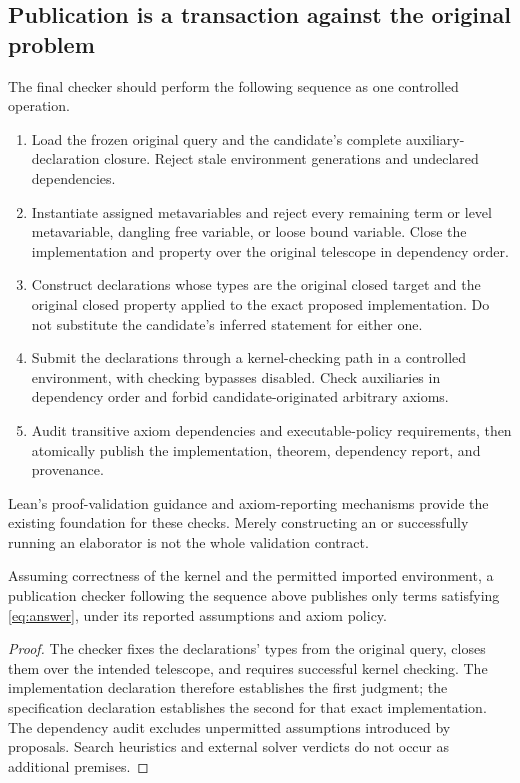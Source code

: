 \subsection{Publication is a transaction against the original problem}
The final checker should perform the following sequence as one controlled operation.
\begin{enumerate}
\item Load the frozen original query and the candidate's complete auxiliary-declaration closure. Reject stale environment generations and undeclared dependencies.
\item Instantiate assigned metavariables and reject every remaining term or level metavariable, dangling free variable, or loose bound variable. Close the implementation and property over the original telescope in dependency order.
\item Construct declarations whose types are the original closed target and the original closed property applied to the exact proposed implementation. Do not substitute the candidate's inferred statement for either one.
\item Submit the declarations through a kernel-checking path in a controlled environment, with checking bypasses disabled. Check auxiliaries in dependency order and forbid candidate-originated arbitrary axioms.
\item Audit transitive axiom dependencies and executable-policy requirements, then atomically publish the implementation, theorem, dependency report, and provenance.
\end{enumerate}
Lean's proof-validation guidance and axiom-reporting mechanisms provide the existing foundation for these checks. Merely constructing an \Expr{} or successfully running an elaborator is not the whole validation contract.\cite{validation,axioms}

\begin{proposition}
Assuming correctness of the kernel and the permitted imported environment, a publication checker following the sequence above publishes only terms satisfying \eqref{eq:answer}, under its reported assumptions and axiom policy.
\end{proposition}
\begin{proof}
The checker fixes the declarations' types from the original query, closes them over the intended telescope, and requires successful kernel checking. The implementation declaration therefore establishes the first judgment; the specification declaration establishes the second for that exact implementation. The dependency audit excludes unpermitted assumptions introduced by proposals. Search heuristics and external solver verdicts do not occur as additional premises.
\end{proof}

